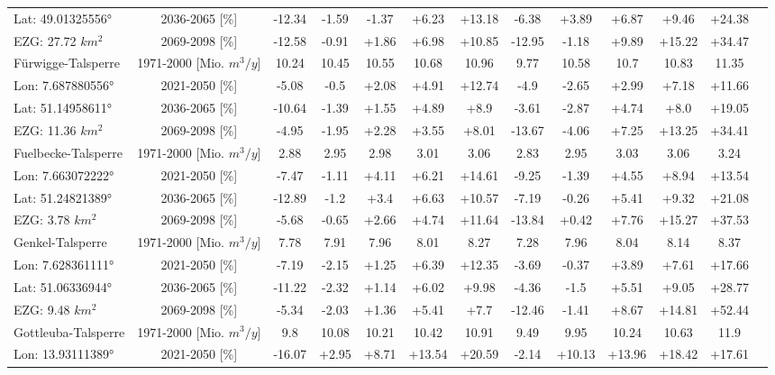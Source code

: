 \begin{longtable}{@{\extracolsep{\fill}}lc|ccccc||cccccc}
Lat: 49.01325556° & 2036-2065 [\%]  & -12.34 & -1.59 & -1.37 & +6.23 & +13.18 & -6.38 & +3.89 & +6.87 & +9.46 & +24.38 & \\ 
EZG: 27.72 $km^2$ & 2069-2098 [\%]  & -12.58 & -0.91 & +1.86 & +6.98 & +10.85 & -12.95 & -1.18 & +9.89 & +15.22 & +34.47 & \\ 
\hline 
Fürwigge-Talsperre & 1971-2000 [Mio. $m^3/y$]  & 10.24 & 10.45 & 10.55 & 10.68 & 10.96 & 9.77 & 10.58 & 10.7 & 10.83 & 11.35 & \\ 
\cline{2-13} 
Lon: 7.687880556° & 2021-2050 [\%]  & -5.08 & -0.5 & +2.08 & +4.91 & +12.74 & -4.9 & -2.65 & +2.99 & +7.18 & +11.66 & \\ 
Lat: 51.14958611° & 2036-2065 [\%]  & -10.64 & -1.39 & +1.55 & +4.89 & +8.9 & -3.61 & -2.87 & +4.74 & +8.0 & +19.05 & \\ 
EZG: 11.36 $km^2$ & 2069-2098 [\%]  & -4.95 & -1.95 & +2.28 & +3.55 & +8.01 & -13.67 & -4.06 & +7.25 & +13.25 & +34.41 & \\ 
\hline 
Fuelbecke-Talsperre & 1971-2000 [Mio. $m^3/y$]  & 2.88 & 2.95 & 2.98 & 3.01 & 3.06 & 2.83 & 2.95 & 3.03 & 3.06 & 3.24 & \\ 
\cline{2-13} 
Lon: 7.663072222° & 2021-2050 [\%]  & -7.47 & -1.11 & +4.11 & +6.21 & +14.61 & -9.25 & -1.39 & +4.55 & +8.94 & +13.54 & \\ 
Lat: 51.24821389° & 2036-2065 [\%]  & -12.89 & -1.2 & +3.4 & +6.63 & +10.57 & -7.19 & -0.26 & +5.41 & +9.32 & +21.08 & \\ 
EZG: 3.78 $km^2$ & 2069-2098 [\%]  & -5.68 & -0.65 & +2.66 & +4.74 & +11.64 & -13.84 & +0.42 & +7.76 & +15.27 & +37.53 & \\ 
\hline 
Genkel-Talsperre & 1971-2000 [Mio. $m^3/y$]  & 7.78 & 7.91 & 7.96 & 8.01 & 8.27 & 7.28 & 7.96 & 8.04 & 8.14 & 8.37 & \\ 
\cline{2-13} 
Lon: 7.628361111° & 2021-2050 [\%]  & -7.19 & -2.15 & +1.25 & +6.39 & +12.35 & -3.69 & -0.37 & +3.89 & +7.61 & +17.66 & \\ 
Lat: 51.06336944° & 2036-2065 [\%]  & -11.22 & -2.32 & +1.14 & +6.02 & +9.98 & -4.36 & -1.5 & +5.51 & +9.05 & +28.77 & \\ 
EZG: 9.48 $km^2$ & 2069-2098 [\%]  & -5.34 & -2.03 & +1.36 & +5.41 & +7.7 & -12.46 & -1.41 & +8.67 & +14.81 & +52.44 & \\ 
\hline 
Gottleuba-Talsperre & 1971-2000 [Mio. $m^3/y$]  & 9.8 & 10.08 & 10.21 & 10.42 & 10.91 & 9.49 & 9.95 & 10.24 & 10.63 & 11.9 & \\ 
\cline{2-13} 
Lon: 13.93111389° & 2021-2050 [\%]  & -16.07 & +2.95 & +8.71 & +13.54 & +20.59 & -2.14 & +10.13 & +13.96 & +18.42 & +17.61 & \\ 

\end{longtable}
